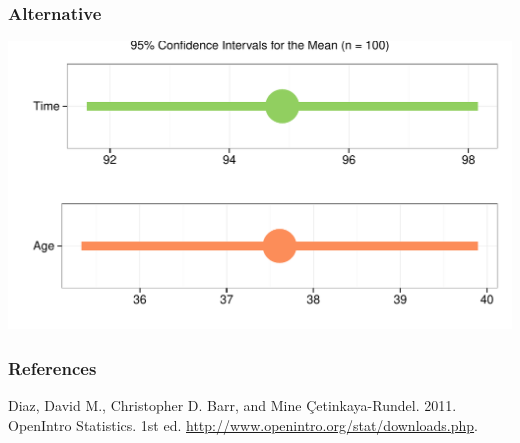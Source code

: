 \documentclass{beamer}\usepackage{graphicx, color}
\makeatletter
\def\maxwidth{ %
  \ifdim\Gin@nat@width>\linewidth
    \linewidth
  \else
    \Gin@nat@width
  \fi
}
\newenvironment{knitrout}{}{} %
\makeatother
\begin{document}

\begin{frame}[fragile]
  \frametitle{Alternative}



\begin{knitrout}
\color{fgcolor}

{\centering \includegraphics[width=\maxwidth]{figure/ConfIntPlot} 

}


\end{knitrout}

\end{frame}


\begin{frame}[allowframebreaks]
  \frametitle{References}
  Diaz, David M., Christopher D. Barr, and Mine \c{C}etinkaya-Rundel. 2011. OpenIntro Statistics. 1st ed. \url{http://www.openintro.org/stat/downloads.php}. \\[0.25cm] 
\end{frame}
\end{document}
